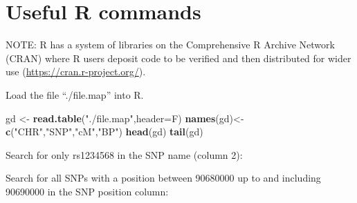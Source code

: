 \documentclass[]{book}
\newenvironment{Shaded}{\begin{snugshade}}{\end{snugshade}}
\newcommand{\KeywordTok}[1]{\textcolor[rgb]{0.13,0.29,0.53}{\textbf{#1}}}
\newcommand{\DataTypeTok}[1]{\textcolor[rgb]{0.13,0.29,0.53}{#1}}
\newcommand{\DecValTok}[1]{\textcolor[rgb]{0.00,0.00,0.81}{#1}}
\newcommand{\StringTok}[1]{\textcolor[rgb]{0.31,0.60,0.02}{#1}}
\newcommand{\FunctionTok}[1]{\textcolor[rgb]{0.00,0.00,0.00}{#1}}
\newcommand{\OperatorTok}[1]{\textcolor[rgb]{0.81,0.36,0.00}{\textbf{#1}}}
\newcommand{\NormalTok}[1]{#1}
\begin{document}
\begin{Shaded}
\end{Shaded}

\section{Useful R commands}\label{useful-r-commands}

NOTE: R has a system of libraries on the Comprehensive R Archive Network
(CRAN) where R users deposit code to be verified and then distributed
for wider use (\url{https://cran.r-project.org/}).

Load the file ``./file.map'' into R.

\begin{Shaded}
\begin{Highlighting}[]
\NormalTok{gd <-}\StringTok{ }\KeywordTok{read.table}\NormalTok{(}\StringTok{"./file.map"}\NormalTok{,}\DataTypeTok{header=}\NormalTok{F)}
\KeywordTok{names}\NormalTok{(gd)<-}\KeywordTok{c}\NormalTok{(}\StringTok{"CHR"}\NormalTok{,}\StringTok{"SNP"}\NormalTok{,}\StringTok{"cM"}\NormalTok{,}\StringTok{"BP"}\NormalTok{)}
\KeywordTok{head}\NormalTok{(gd)}
\KeywordTok{tail}\NormalTok{(gd)}
\end{Highlighting}
\end{Shaded}

Search for only rs1234568 in the SNP name (column 2):

\begin{Shaded}
\end{Shaded}

Search for all SNPs with a position between 90680000 up to and including
90690000 in the SNP position column:

\begin{Shaded}
\end{Shaded}
\end{document}
